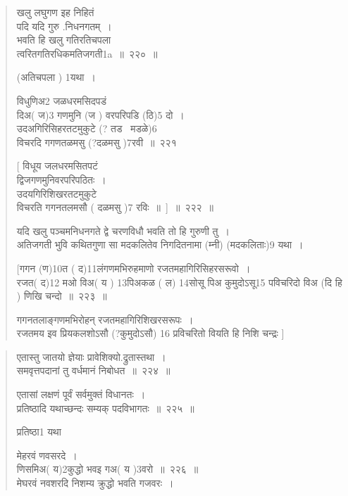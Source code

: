 \documentclass[11pt, openany]{book}
\begin{document}
\begin{quote}
{\na खलु लघुगण इह निहितं \\
 पदि यदि गुरु .निधनगतम्~। \\
भवति हि खलु गतिरतिचपला \\
 त्वरितगतिरधिकमतिजगती1a~॥~२२०~॥}

(अतिचपला ) 1यथा~। 

 {\na विधुणिअ2 जळधरमसिदपडं \\
 दिअ( ज)3 गणमुनि (ज ) वरपरिपडि (ठि)5 दो~।\\
 उदअगिरिसिहरतटमुकुटे (? तड \textendash\ मडळे)6\\
 विचरदि गगणतळमसु (?दळमसु )7रवी~॥~२२१

[ विधूय जलधरमसितपटं \\
द्विजगणमुनिवरपरिपठितः~। \\
उदयगिरिशिखरतटमुकुटे \\
विचरति गगनतलमसौ ( दळमसु )7 रविः~॥~]~॥~२२२~॥}

{\qt यदि खलु पञ्चमनिधनगते द्वे चरणविधौ भवति तो हि गुरुणी तु~।\\
अतिजगती भुवि कथितगुणा सा मदकलितेव निगदितनामा (म्नी) (मदकलिताः)9 यथा~।}

{\na [गगन (ण)10त ( द)11लंगणमभिरुहमाणो रजतमहागिरिसिहरसरूवो~।\\
रजत( द)12 मओ विअ( य ) 13पिअकळ ( ल) 14सोसू पिअ कुमुदोऽसू15 पविचरिदो विअ (दि हि ) णिखि चन्दो~॥~२२३~॥}

{\qt गगनतलाङ्गणमभिरोहन् रजतमहागिरिशिखरसरूपः~। \\
रजतमय इव प्रियकलशोऽसौ (?कुमुदोऽसौ) 16 प्रविचरितो वियति हि निशि चन्द्रः ] }
\end{quote}


\newpage

\begin{quote}
{\na एतास्तु जातयो ज्ञेयाः प्रावेशिक्यो.द्रुतास्तथा~। \\
समवृत्तपदानां तु वर्धमानं निबोधत~॥~२२४~॥

एतासां लक्षणं पूर्वं सर्वमुक्तं विधानतः~।\\
प्रतिष्ठादि यथाच्छन्दः सम्यक् पदविभागतः~॥~२२५~॥}

प्रतिष्ठा1 यथा

{\na मेहरवं णवसरदे~।\\
णिसमिअ( य)2कुद्धो भवइ गअ( य )3वरो~॥~२२६~॥\\
मेघरवं नवशरदि निशम्य क्रुद्धो भवति गजवरः~। }
\end{quote}
\end{document}
